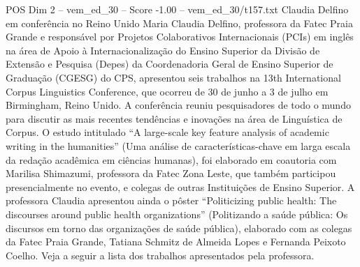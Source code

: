 \begin{textsample}{POS Dim 2 – vem\_ed\_30 – Score -1.00 – vem\_ed\_30/t157.txt}  \label{ex:f2_pos_050}
Claudia Delfino em conferência no Reino Unido Maria Claudia Delfino, professora da Fatec Praia Grande e responsável por Projetos Colaborativos Internacionais (PCIs) em inglês na área de Apoio à Internacionalização do Ensino Superior da Divisão de Extensão e Pesquisa (Depes) da Coordenadoria Geral de Ensino Superior de Graduação (CGESG) do CPS, apresentou seis trabalhos na 13th International Corpus Linguistics Conference, que ocorreu de 30 de junho a 3 de julho em Birmingham, Reino Unido.
A conferência reuniu pesquisadores de todo o mundo para discutir as mais recentes tendências e inovações na área de Linguística de Corpus.
O estudo intitulado “A large-scale key feature analysis of academic writing in the humanities” (Uma análise de características-chave em larga escala da redação acadêmica em ciências humanas), foi elaborado em coautoria com Marilisa Shimazumi, professora da Fatec Zona Leste, que também participou presencialmente no evento, e colegas de outras Instituições de Ensino Superior.
A professora Claudia apresentou ainda o pôster “Politicizing public health: The discourses around public health organizations” (Politizando a saúde pública: Os discursos em torno das organizações de saúde pública), elaborado com as colegas da Fatec Praia Grande, Tatiana Schmitz de Almeida Lopes e Fernanda Peixoto Coelho.
Veja a seguir a lista dos trabalhos apresentados pela professora.

\end{textsample}
